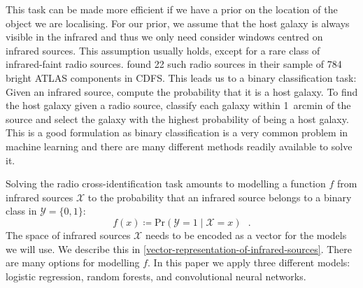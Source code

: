 \documentclass[fleqn,usenatbib,usedcolumn]{mnras}
\begin{document}
    This task can be made more efficient if we have a prior on the location of
    the object we are localising. For our prior, we assume that the host galaxy
    is always visible in the infrared and thus we only need consider windows
    centred on infrared sources. This assumption usually holds, except for a
    rare class of infrared-faint radio sources. \citet{norris06} found 22 such
    radio sources in their sample of 784 bright ATLAS components in CDFS. This
    leads us to a binary classification task: Given an infrared source, compute
    the probability that it is a host galaxy. To find the host galaxy given a
    radio source, classify each galaxy within 1~arcmin of the source and select
    the galaxy with the highest probability of being a host galaxy. This is a
    good formulation as binary classification is a very common problem in
    machine learning and there are many different methods readily available to
    solve it.

    Solving the radio cross-identification task amounts to modelling a function
    $f$ from infrared sources $\mathcal{X}$ to the probability that an infrared
    source belongs to a binary class in $\mathcal{Y} = \{0, 1\}$:
    \begin{equation}
        f(x) \coloneqq \text{Pr}\left(\mathcal{Y} = 1 \mid \mathcal X = x\right)\,\,\,\,.
    \end{equation}
    The space of infrared sources $\mathcal{X}$ needs to be encoded as a vector
    for the models we will use. We describe this in
    \autoref{vector-representation-of-infrared-sources}. There are many options
    for modelling $f$. In this paper we apply three different models: logistic
    regression, random forests, and convolutional neural networks.
\end{document}
